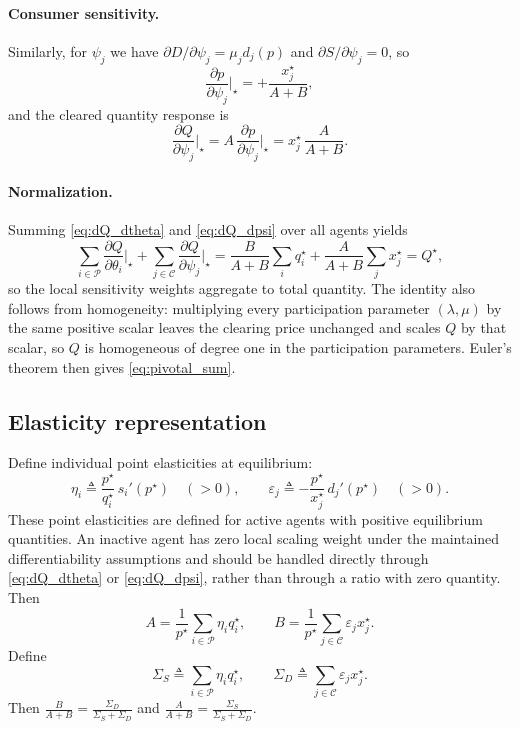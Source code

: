 \documentclass[journal, a4paper]{IEEEtran}
\begin{document}
\paragraph{Consumer sensitivity.}
Similarly, for $\psi_j$ we have $\partial D/\partial \psi_j=\mu_j d_j(p)$ and $\partial S/\partial \psi_j=0$, so
\begin{equation}
\frac{\partial p}{\partial \psi_j}\Big|_\star = +\frac{x_j^\star}{A+B},
\end{equation}
and the cleared quantity response is
\begin{equation}
\frac{\partial Q}{\partial \psi_j}\Big|_\star
=
A\,\frac{\partial p}{\partial \psi_j}\Big|_\star
=
x_j^\star\,\frac{A}{A+B}.
\label{eq:dQ_dpsi}
\end{equation}

\paragraph{Normalization.}
Summing \eqref{eq:dQ_dtheta} and \eqref{eq:dQ_dpsi} over all agents yields
\begin{equation}
\sum_{i\in\mathcal{P}}\frac{\partial Q}{\partial \theta_i}\Big|_\star
+
\sum_{j\in\mathcal{C}}\frac{\partial Q}{\partial \psi_j}\Big|_\star
=
\frac{B}{A+B}\sum_i q_i^\star+\frac{A}{A+B}\sum_j x_j^\star
=
Q^\star,
\label{eq:pivotal_sum}
\end{equation}
so the local sensitivity weights aggregate to total quantity. The identity also follows from homogeneity: multiplying every participation parameter $(\lambda,\mu)$ by the same positive scalar leaves the clearing price unchanged and scales $Q$ by that scalar, so $Q$ is homogeneous of degree one in the participation parameters. Euler's theorem then gives \eqref{eq:pivotal_sum}.

\subsection{Elasticity representation}
Define individual point elasticities at equilibrium:
\begin{equation}
\eta_i \triangleq \frac{p^\star}{q_i^\star}\,s_i'(p^\star)\quad(>0),\qquad
\varepsilon_j \triangleq -\frac{p^\star}{x_j^\star}\,d_j'(p^\star)\quad(>0).
\end{equation}
These point elasticities are defined for active agents with positive equilibrium quantities. An inactive agent has zero local scaling weight under the maintained differentiability assumptions and should be handled directly through \eqref{eq:dQ_dtheta} or \eqref{eq:dQ_dpsi}, rather than through a ratio with zero quantity.
Then
\begin{equation}
A=\frac{1}{p^\star}\sum_{i\in\mathcal{P}}\eta_i q_i^\star,\qquad
B=\frac{1}{p^\star}\sum_{j\in\mathcal{C}}\varepsilon_j x_j^\star.
\label{eq:AB_elast}
\end{equation}
Define
\begin{equation}
\Sigma_S \triangleq \sum_{i\in\mathcal{P}}\eta_i q_i^\star,\qquad
\Sigma_D \triangleq \sum_{j\in\mathcal{C}}\varepsilon_j x_j^\star.
\label{eq:SigmaSD}
\end{equation}
Then $\frac{B}{A+B}=\frac{\Sigma_D}{\Sigma_S+\Sigma_D}$ and $\frac{A}{A+B}=\frac{\Sigma_S}{\Sigma_S+\Sigma_D}$.
\end{document}
